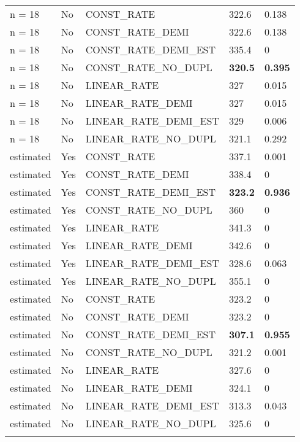 \begin{longtable}{lllll}
\hline

n = 18 &
No &
CONST\_RATE &
322.6 &
0.138\\
n = 18 &
No &
CONST\_RATE\_DEMI &
322.6 &
0.138\\
n = 18 &
No &
CONST\_RATE\_DEMI\_EST &
335.4 &
0\\
n = 18 &
No &
CONST\_RATE\_NO\_DUPL &
\textbf{320.5} &
\textbf{0.395} \\
n = 18 &
No &
LINEAR\_RATE &
327 &
0.015\\
n = 18 &
No &
LINEAR\_RATE\_DEMI &
327 &
0.015\\
n = 18 &
No &
LINEAR\_RATE\_DEMI\_EST &
329 &
0.006\\
n = 18 &
No &
LINEAR\_RATE\_NO\_DUPL &
321.1 &
0.292\\

\hline

estimated &
Yes &
CONST\_RATE &
337.1 &
0.001\\
estimated &
Yes &
CONST\_RATE\_DEMI &
338.4 &
0\\
estimated &
Yes &
CONST\_RATE\_DEMI\_EST &
\textbf{323.2} &
\textbf{0.936}\\
estimated &
Yes &
CONST\_RATE\_NO\_DUPL &
360 &
0\\
estimated &
Yes &
LINEAR\_RATE &
341.3 &
0\\
estimated &
Yes &
LINEAR\_RATE\_DEMI &
342.6 &
0 \\
estimated &
Yes &
LINEAR\_RATE\_DEMI\_EST &
328.6 &
0.063 \\
estimated &
Yes &
LINEAR\_RATE\_NO\_DUPL &
355.1 &
0 \\

\hline

estimated &
No &
CONST\_RATE &
323.2 &
0\\
estimated &
No &
CONST\_RATE\_DEMI &
323.2 &
0\\
estimated &
No &
CONST\_RATE\_DEMI\_EST &
\textbf{307.1} &
\textbf{0.955}\\
estimated &
No &
CONST\_RATE\_NO\_DUPL &
321.2 &
0.001\\
estimated &
No &
LINEAR\_RATE &
327.6 &
0\\
estimated &
No &
LINEAR\_RATE\_DEMI &
324.1 &
0\\
estimated &
No &
LINEAR\_RATE\_DEMI\_EST &
313.3 &
0.043\\
estimated &
No &
LINEAR\_RATE\_NO\_DUPL &
325.6 &
0\\

\hline

\label{table-dup-results}
\end{longtable}
